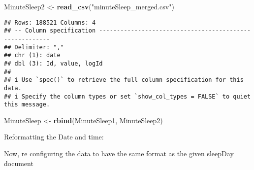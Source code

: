 \documentclass[
]{article}
\newenvironment{Shaded}{\begin{snugshade}}{\end{snugshade}}
\newcommand{\AttributeTok}[1]{\textcolor[rgb]{0.13,0.29,0.53}{#1}}
\newcommand{\ConstantTok}[1]{\textcolor[rgb]{0.56,0.35,0.01}{#1}}
\newcommand{\FunctionTok}[1]{\textcolor[rgb]{0.13,0.29,0.53}{\textbf{#1}}}
\newcommand{\NormalTok}[1]{#1}
\newcommand{\OtherTok}[1]{\textcolor[rgb]{0.56,0.35,0.01}{#1}}
\newcommand{\SpecialCharTok}[1]{\textcolor[rgb]{0.81,0.36,0.00}{\textbf{#1}}}
\newcommand{\StringTok}[1]{\textcolor[rgb]{0.31,0.60,0.02}{#1}}
\begin{document}
\begin{Shaded}
\begin{Highlighting}[]
\NormalTok{MinuteSleep2 }\OtherTok{\textless{}{-}} \FunctionTok{read\_csv}\NormalTok{(}\StringTok{"minuteSleep\_merged.csv"}\NormalTok{)}
\end{Highlighting}
\end{Shaded}

\begin{verbatim}
## Rows: 188521 Columns: 4
## -- Column specification --------------------------------------------------------
## Delimiter: ","
## chr (1): date
## dbl (3): Id, value, logId
## 
## i Use `spec()` to retrieve the full column specification for this data.
## i Specify the column types or set `show_col_types = FALSE` to quiet this message.
\end{verbatim}

\begin{Shaded}
\begin{Highlighting}[]
\NormalTok{MinuteSleep }\OtherTok{\textless{}{-}} \FunctionTok{rbind}\NormalTok{(MinuteSleep1, MinuteSleep2)}
\end{Highlighting}
\end{Shaded}

Reformatting the Date and time:

\begin{Shaded}
\end{Shaded}

Now, re configuring the data to have the same format as the given
sleepDay document
\end{document}
